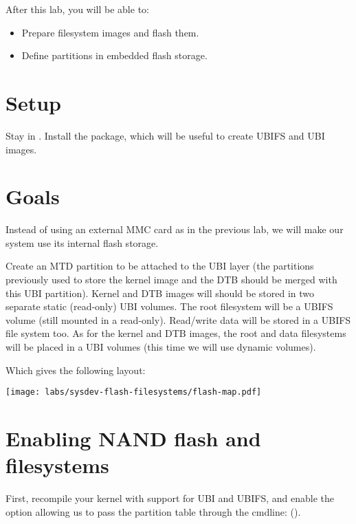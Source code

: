 
After this lab, you will be able to:
\begin{itemize}
\item Prepare filesystem images and flash them.
\item Define partitions in embedded flash storage.
\end{itemize}

\section{Setup}

Stay in . Install the
 package, which will be useful to create UBIFS and
UBI images.

\section{Goals}

Instead of using an external MMC card as in the previous lab, we will
make our system use its internal flash storage.

Create an MTD partition to be attached to the UBI layer (the partitions
previously used to store the kernel image and the DTB should be merged
with this UBI partition).
Kernel and DTB images will should be stored in two separate static
(read-only) UBI volumes.
The root filesystem will be a UBIFS volume (still mounted in a read-only).
Read/write data will be stored in a UBIFS file system too.
As for the kernel and DTB images, the root and data filesystems will be
placed in a UBI volumes (this time we will use dynamic volumes).

Which gives the following layout:

\begin{center}
  \texttt{[image: labs/sysdev-flash-filesystems/flash-map.pdf]}
\end{center}

\section{Enabling NAND flash and filesystems}

First, recompile your kernel with support for UBI and UBIFS, and enable
the option allowing us to pass the partition table through the cmdline:
().

